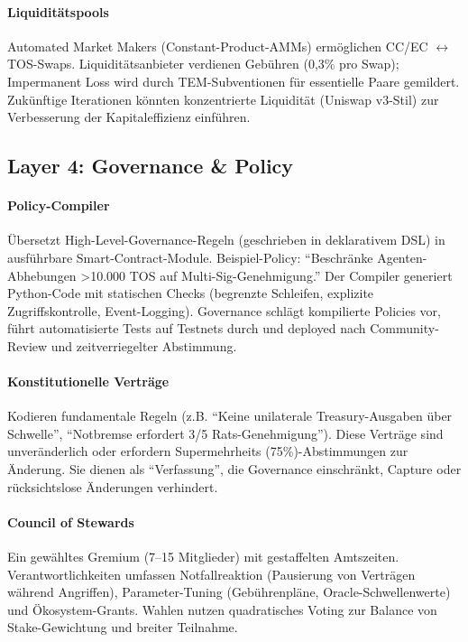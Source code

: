 \documentclass[11pt]{article}
\begin{document}
\paragraph{Liquiditätspools} Automated Market Makers (Constant-Product-AMMs) ermöglichen CC/EC $\leftrightarrow$ TOS-Swaps. Liquiditätsanbieter verdienen Gebühren (0,3\% pro Swap); Impermanent Loss wird durch TEM-Subventionen für essentielle Paare gemildert. Zukünftige Iterationen könnten konzentrierte Liquidität (Uniswap v3-Stil) zur Verbesserung der Kapitaleffizienz einführen.

\subsection{Layer 4: Governance \& Policy}
\paragraph{Policy-Compiler} Übersetzt High-Level-Governance-Regeln (geschrieben in deklarativem DSL) in ausführbare Smart-Contract-Module. Beispiel-Policy: ``Beschränke Agenten-Abhebungen >10.000 TOS auf Multi-Sig-Genehmigung.'' Der Compiler generiert Python-Code mit statischen Checks (begrenzte Schleifen, explizite Zugriffskontrolle, Event-Logging). Governance schlägt kompilierte Policies vor, führt automatisierte Tests auf Testnets durch und deployed nach Community-Review und zeitverriegelter Abstimmung.

\paragraph{Konstitutionelle Verträge} Kodieren fundamentale Regeln (z.B. ``Keine unilaterale Treasury-Ausgaben über Schwelle'', ``Notbremse erfordert 3/5 Rats-Genehmigung''). Diese Verträge sind unveränderlich oder erfordern Supermehrheits (75\%)-Abstimmungen zur Änderung. Sie dienen als ``Verfassung'', die Governance einschränkt, Capture oder rücksichtslose Änderungen verhindert.

\paragraph{Council of Stewards} Ein gewähltes Gremium (7--15 Mitglieder) mit gestaffelten Amtszeiten. Verantwortlichkeiten umfassen Notfallreaktion (Pausierung von Verträgen während Angriffen), Parameter-Tuning (Gebührenpläne, Oracle-Schwellenwerte) und Ökosystem-Grants. Wahlen nutzen quadratisches Voting zur Balance von Stake-Gewichtung und breiter Teilnahme.
\end{document}
